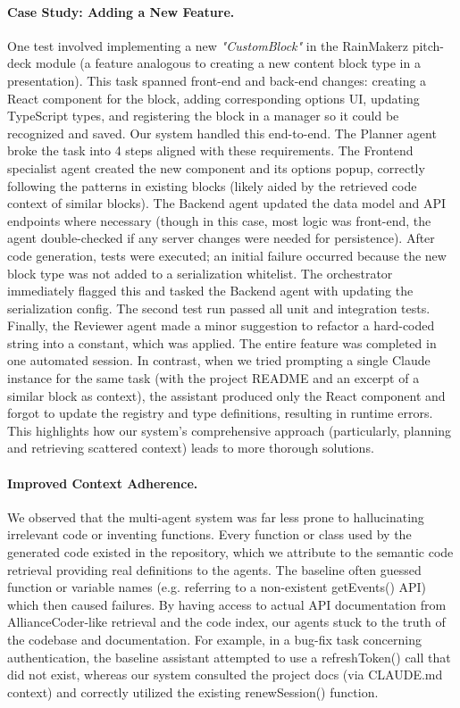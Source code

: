 \documentclass[11pt]{article}
\begin{document}
\paragraph{Case Study: Adding a New Feature.} One test involved implementing a new \textit{"CustomBlock"} in the RainMakerz pitch-deck module (a feature analogous to creating a new content block type in a presentation). This task spanned front-end and back-end changes: creating a React component for the block, adding corresponding options UI, updating TypeScript types, and registering the block in a manager so it could be recognized and saved. Our system handled this end-to-end. The Planner agent broke the task into 4 steps aligned with these requirements. The Frontend specialist agent created the new component and its options popup, correctly following the patterns in existing blocks (likely aided by the retrieved code context of similar blocks). The Backend agent updated the data model and API endpoints where necessary (though in this case, most logic was front-end, the agent double-checked if any server changes were needed for persistence). After code generation, tests were executed; an initial failure occurred because the new block type was not added to a serialization whitelist. The orchestrator immediately flagged this and tasked the Backend agent with updating the serialization config. The second test run passed all unit and integration tests. Finally, the Reviewer agent made a minor suggestion to refactor a hard-coded string into a constant, which was applied. The entire feature was completed in one automated session. In contrast, when we tried prompting a single Claude instance for the same task (with the project README and an excerpt of a similar block as context), the assistant produced only the React component and forgot to update the registry and type definitions, resulting in runtime errors. This highlights how our system's comprehensive approach (particularly, planning and retrieving scattered context) leads to more thorough solutions.

\paragraph{Improved Context Adherence.} We observed that the multi-agent system was far less prone to hallucinating irrelevant code or inventing functions. Every function or class used by the generated code existed in the repository, which we attribute to the semantic code retrieval providing real definitions to the agents. The baseline often guessed function or variable names (e.g. referring to a non-existent getEvents() API) which then caused failures. By having access to actual API documentation from AllianceCoder-like retrieval and the code index, our agents stuck to the truth of the codebase and documentation. For example, in a bug-fix task concerning authentication, the baseline assistant attempted to use a refreshToken() call that did not exist, whereas our system consulted the project docs (via CLAUDE.md context) and correctly utilized the existing renewSession() function.
\end{document}
